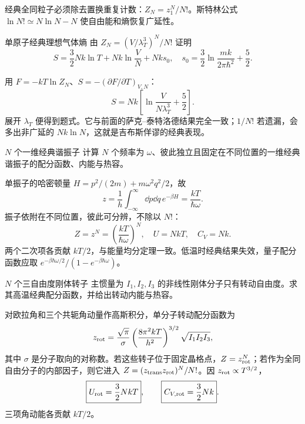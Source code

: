 经典全同粒子必须除去置换重复计数：$Z_N=z_1^N/N!$。斯特林公式
$\ln N!\simeq N\ln N-N$ 使自由能和熵恢复广延性。

\begin{advexamplebox}{单原子经典理想气体熵}\label{advA2:ex:classical-entropy}
由 $Z_N=(V/\lambda_T^3)^N/N!$ 证明
\[
 S=\frac32Nk\ln T+Nk\ln\frac VN+Nks_0,
 \quad
 s_0=\frac32\ln\frac{mk}{2\pi\hbar^2}+\frac52.
\]

\AQClassicalEntropy
\end{advexamplebox}
\begin{advsolution}
\AAClassicalEntropy

用 $F=-kT\ln Z_N$、$S=-(\partial F/\partial T)_{V,N}$：
\[
 S=Nk\left[\ln\frac{V}{N\lambda_T^3}+\frac52\right].
\]
展开 $\lambda_T$ 便得到题式。它与前面的萨克--泰特洛德结果完全一致；$1/N!$ 若遗漏，会多出非广延的 $Nk\ln N$，这就是吉布斯佯谬的经典表现。
\end{advsolution}

\begin{advexamplebox}{$N$ 个一维经典谐振子}\label{advA2:ex:harmonic-partition}
计算 $N$ 个频率为 $\omega$、彼此独立且固定在不同位置的一维经典谐振子的配分函数、内能与热容。

\AQOscillators
\end{advexamplebox}
\begin{advsolution}
\AAOscillators

单振子的哈密顿量 $H=p^2/(2m)+m\omega^2q^2/2$，故
\[
 z=\frac1h\int_{-\infty}^{\infty}\!\dd p\dd q\,e^{-\beta H}
 =\frac{kT}{\hbar\omega}.
\]
振子依附在不同位置，彼此可分辨，不除以 $N!$：
\[
 \boxed{Z=z^N=\left(\frac{kT}{\hbar\omega}\right)^N},
 \quad
 \boxed{U=NkT},\quad \boxed{C_V=Nk}.
\]
两个二次项各贡献 $kT/2$，与能量均分定理一致。低温时经典结果失效，量子配分函数应取
$e^{-\beta\hbar\omega/2}/(1-e^{-\beta\hbar\omega})$。
\end{advsolution}

\begin{advexamplebox}{$N$ 个三自由度刚体转子}\label{advA2:ex:rigid-rotor-partition}
主惯量为 $I_1,I_2,I_3$ 的非线性刚体分子只有转动自由度。求其高温经典配分函数，并给出转动内能与热容。

\AQRotors
\end{advexamplebox}
\begin{advsolution}
\AARotors

对欧拉角和三个共轭角动量作高斯积分，单分子转动配分函数为
\[
 z_{\rm rot}=\frac{\sqrt\pi}{\sigma}
 \left(\frac{8\pi^2kT}{h^2}\right)^{3/2}
 \sqrt{I_1I_2I_3},
\]
其中 $\sigma$ 是分子取向的对称数。若这些转子位于固定晶格点，$Z=z_{\rm rot}^N$；若作为全同自由分子的内部因子，则它进入
$Z=(z_{\rm trans}z_{\rm rot})^N/N!$。因 $z_{\rm rot}\propto T^{3/2}$，
\[
 \boxed{U_{\rm rot}=\frac32NkT},
 \qquad \boxed{C_{V,\rm rot}=\frac32Nk}.
\]
三项角动能各贡献 $kT/2$。
\end{advsolution}

